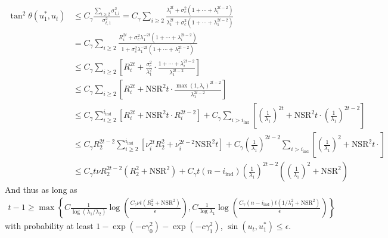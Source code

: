 \documentclass[10pt]{article}
\newcommand{\nsrmax}{\text{NSR}}
\newcommand{\ind}{\mathrm{ind}}
\begin{document}
\begin{align*}
\tan^2\theta(u_1^*, u_t)  &\leq C_\gamma \frac{\sum_{i\geq 2} \sigma_{t,i}^2}{\sigma_{t,1}^2} = C_\gamma \sum_{i\geq 2}  \frac{ \lambda_i^{2t} + \sigma_c^2(1 + \cdots + \lambda_i^{2t-2}) }{\lambda_1^{2t} + \sigma_c^2(1 + \cdots + \lambda_1^{2t-2})} \\
&= C_\gamma \sum_{i\geq 2}  \frac{ R_i^{2t} + \sigma_c^2\lambda_1^{-2t}(1 + \cdots + \lambda_i^{2t-2}) }{1 + \sigma_c^2\lambda_1^{-2t}(1 + \cdots + \lambda_1^{2t-2})} \\
&\leq C_\gamma \sum_{i\geq 2} \left[ R_i^{2t} +  \frac{\sigma_c^2}{\lambda_1^2} \cdot \frac{1 + \cdots + \lambda_i^{2t-2}}{\lambda_1^{2t-2}} \right] \\
&\leq C_\gamma \sum_{i\geq 2} \left[ R_i^{2t} +  \nsrmax^2 t \cdot \frac{\max(1, \lambda_i)^{2t-2}}{\lambda_1^{2t-2}} \right] \\
&\leq C_\gamma \sum_{i\geq 2}^{i_\ind} \left[R_i^{2t} +  \nsrmax^2 t \cdot R_i^{2t-2}\right] + C_\gamma \sum_{i > i_\ind} \left[\left(\frac{1}{\lambda_1}\right)^{2t} +  \nsrmax^2 t \cdot \left(\frac{1}{\lambda_1}\right)^{2t-2}\right] \\
&\leq C_\gamma R_2^{2t-2} \sum_{i\geq 2}^{i_\ind}  \left[ \nu_i^{2t} R_2^{2} +  \nu_i^{2t-2}\nsrmax^2 t \right] + C_\gamma \left(\frac{1}{\lambda_1}\right)^{2t-2} \sum_{i > i_\ind} \left[\left(\frac{1}{\lambda_1}\right)^{2} +  \nsrmax^2 t \cdot\right] \\
&\leq C_\gamma t \nu R_2^{2t-2} \left( R_2^2 + \nsrmax^2\right) + C_\gamma t (n - i_\ind) \left(\frac{1}{\lambda_1}\right)^{2t-2} \left(\left(\frac{1}{\lambda_1}\right)^{2} +  \nsrmax^2 \right) 
\end{align*}
And thus as long as 
\begin{align*}
t - 1 \geq \max \left\{C \frac{1}{\log(\lambda_1/\lambda_2)} \log   \left( \frac{C_{\gamma} \nu t (R_2^2 + \nsrmax^2)}{\epsilon}\right),  C \frac{1}{\log \lambda_1} \log   \left( \frac{C_{\gamma} (n - i_\ind) t (1 /\lambda_1^2 + \nsrmax^2)}{\epsilon}\right) \right\}
\end{align*}
with probability at least $1 - \exp(- c \gamma_0^2) - \exp(-c \gamma_1^2)$, $\sin(u_t, u_1^*) \leq \epsilon$.
\end{document}
